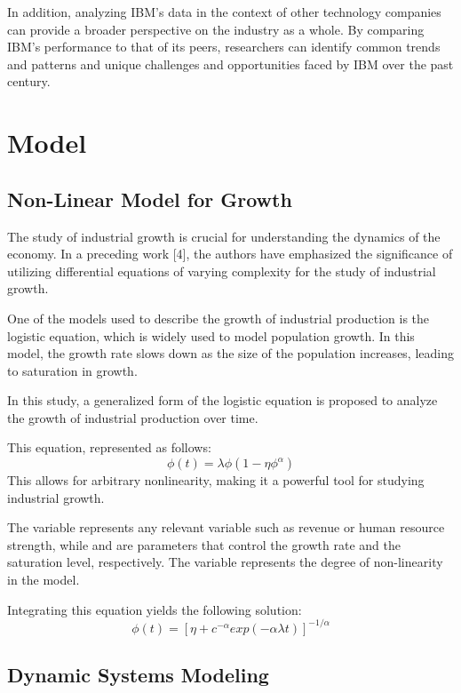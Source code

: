 \documentclass[aps,twocolumn,10pt,reprint]{revtex4}
\newcommand{\be}{\begin{equation}}
\newcommand{\ee}{\end{equation}}
\begin{document}
In addition, analyzing IBM's data in the context of other technology companies can provide a broader perspective on the industry as a whole. By comparing IBM's performance to that of its peers, researchers can identify common trends and patterns and unique challenges and opportunities faced by IBM over the past century.


\section{Model}

\subsection{Non-Linear Model for Growth}

The study of industrial growth is crucial for understanding the dynamics of the economy. In a preceding work [4], the authors have emphasized the significance of utilizing differential equations of varying complexity for the study of industrial growth.

One of the models used to describe the growth of industrial production is the logistic equation, which is widely used to model population growth. In this model, the growth rate slows down as the size of the population increases, leading to saturation in growth.

In this study, a generalized form of the logistic equation is proposed to analyze the growth of industrial production over time. 

This equation, represented as follows:\\ 
\be\label{Eq:Logistic}
\phi(t) = \lambda \phi (1 - \eta \phi^{\alpha}) 
\ee 
This allows for arbitrary nonlinearity, making it a powerful tool for studying industrial growth.

The variable \phi represents any relevant variable such as revenue or human resource strength, while \lambda and \eta are parameters that control the growth rate and the saturation level, respectively. The variable \alpha represents the degree of non-linearity in the model.

Integrating this equation yields the following solution:
\be\label{Eq:LogisticSol}
\phi(t) = [\eta + c^{- \alpha}exp(-\alpha \lambda t)]^{-1/\alpha}
\ee


\subsection{Dynamic Systems Modeling}
\end{document}

